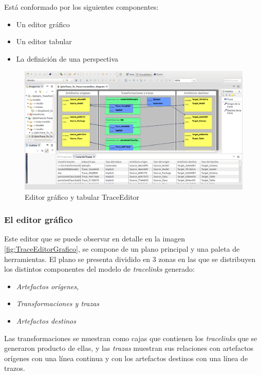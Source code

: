\documentclass[a4paper,12pt,twoside,spanish,openright]{book}
\begin{document}
Está conformado por los siguientes componentes:

\begin{itemize}
\item Un editor gráfico
\item Un editor tabular
\item La definición de una perspectiva 
\end{itemize}


\begin{figure}[hbtp]
\centering
\includegraphics[scale=.29]{./img/TraceEditorEjemplo}
\caption{Editor gráfico y tabular TraceEditor}
\label{fig:TraceEditorEjemplo}
\end{figure}


\subsubsection{El editor gráfico}

Este editor que se puede observar en detalle en la imagen \ref{fig:TraceEditorGrafico}, se compone de un plano principal y una paleta de herramientas. El plano se presenta dividido en 3 zonas en las que se distribuyen los distintos componentes del modelo de \textit{tracelinks} generado:

\begin{itemize}
\item \textsf{\textit{Artefactos orígenes}}, 
\item \textsf{\textit{Transformaciones y trazas}}
\item \textsf{\textit{Artefactos destinos}} 
\end{itemize} 

Las transformaciones se muestran como cajas que contienen los \textit{tracelinks} que se generaron producto de ellas, y las \textit{trazas} muestran sus relaciones con artefactos orígenes con una línea continua y con los artefactos destinos con una línea de trazos.
\end{document}
